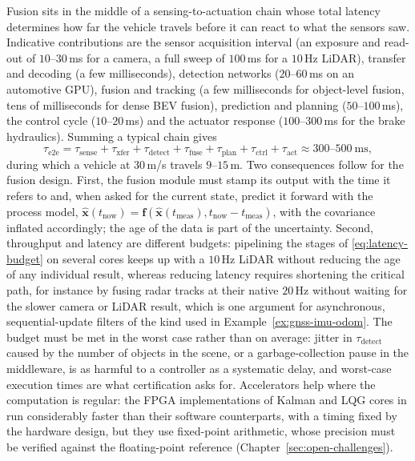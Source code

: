 \documentclass[graybox,envcountchap]{style/SNmono}
\begin{document}
Fusion sits in the middle of a sensing-to-actuation chain whose total latency determines how far the vehicle travels before it can react to what the sensors saw. Indicative contributions are the sensor acquisition interval (an exposure and read-out of $10$--$30$\,ms for a camera, a full sweep of $100$\,ms for a $10$\,Hz LiDAR), transfer and decoding (a few milliseconds), detection networks ($20$--$60$\,ms on an automotive GPU), fusion and tracking (a few milliseconds for object-level fusion, tens of milliseconds for dense BEV fusion), prediction and planning ($50$--$100$\,ms), the control cycle ($10$--$20$\,ms) and the actuator response ($100$--$300$\,ms for the brake hydraulics). Summing a typical chain gives
\begin{equation}
\tau_{\mathrm{e2e}}=\tau_{\mathrm{sense}}+\tau_{\mathrm{xfer}}+\tau_{\mathrm{detect}}+\tau_{\mathrm{fuse}}+\tau_{\mathrm{plan}}+\tau_{\mathrm{ctrl}}+\tau_{\mathrm{act}}\approx 300\text{--}500\ \mathrm{ms},
\label{eq:latency-budget}
\end{equation}
during which a vehicle at $30$\,m/s travels $9$--$15$\,m. Two consequences follow for the fusion design. First, the fusion module must stamp its output with the time it refers to and, when asked for the current state, predict it forward with the process model, $\widehat{\mathbf{x}}(t_{\mathrm{now}})=\mathbf{f}(\widehat{\mathbf{x}}(t_{\mathrm{meas}}),t_{\mathrm{now}}-t_{\mathrm{meas}})$, with the covariance inflated accordingly; the age of the data is part of the uncertainty. Second, throughput and latency are different budgets: pipelining the stages of \eqref{eq:latency-budget} on several cores keeps up with a $10$\,Hz LiDAR without reducing the age of any individual result, whereas reducing latency requires shortening the critical path, for instance by fusing radar tracks at their native $20$\,Hz without waiting for the slower camera or LiDAR result, which is one argument for asynchronous, sequential-update filters of the kind used in Example~\ref{ex:gnss-imu-odom}. The budget must be met in the worst case rather than on average: jitter in $\tau_{\mathrm{detect}}$ caused by the number of objects in the scene, or a garbage-collection pause in the middleware, is as harmful to a controller as a systematic delay, and worst-case execution times are what certification asks for. Accelerators help where the computation is regular: the FPGA implementations of Kalman and LQG cores in \cite{deliparaschos2016_jee_fpga} run considerably faster than their software counterparts, with a timing fixed by the hardware design, but they use fixed-point arithmetic, whose precision must be verified against the floating-point reference (Chapter~\ref{sec:open-challenges}).
\end{document}
